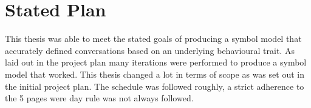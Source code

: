 


\section{Stated Plan}
This thesis was able to meet the stated goals of producing a symbol model that accurately defined conversations based on an underlying behavioural trait. As laid out in the project plan many iterations were performed to produce a symbol model that worked. This thesis changed a lot in terms of scope as was set out in the initial project plan.  The schedule was followed roughly, a strict adherence to the 5 pages were day rule was not always followed. 